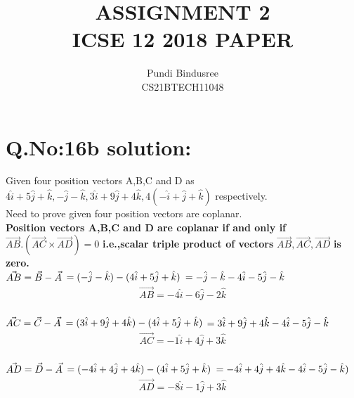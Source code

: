 \documentclass[journal, 11pt,twocolumn]{IEEEtran}
\begin{document}
\title{\huge ASSIGNMENT 2\\ \huge ICSE 12 2018 PAPER}
\author{\Small Pundi Bindusree\\ \small CS21BTECH11048 }
\maketitle
\vspace{-12pt}
\section*{\small Q.No:16b solution:}
Given four position vectors A,B,C and D as $4\hat{i}+5\hat{j}+\hat{k},-\hat{j}-\hat{k},3\hat{i}+9\hat{j}+4\hat{k},4(-\hat{i}+\hat{j}+\hat{k})$ respectively.\\
Need to prove given four position vectors are coplanar.\\
\textbf{Position vectors A,B,C and D are coplanar if and only if} $\vec{AB}.(\vec{AC}\times\vec{AD})=0$ \textbf{i.e.,scalar triple product of vectors} $\vec{AB},\vec{AC},\vec{AD}$ \textbf{is zero.}\\

$\vec{AB} = \vec{B}-\vec{A}\nonumber\\$
$         = (-\hat{j}-\hat{k})-(4\hat{i}+5\hat{j}+\hat{k})\nonumber\\$
$         = -\hat{j}-\hat{k}-4\hat{i}-5\hat{j}-\hat{k}\nonumber\\$
\begin{align}\vec{AB} = -4\hat{i}-6\hat{j}-2\hat{k}\end{align}\\
$\vec{AC} = \vec{C}-\vec{A}\nonumber\\$
$         = (3\hat{i}+9\hat{j}+4\hat{k})-(4\hat{i}+5\hat{j}+\hat{k})\nonumber\\$      
$         = 3\hat{i}+9\hat{j}+4\hat{k}-4\hat{i}-5\hat{j}-\hat{k}\nonumber\\$   
\begin{align}\vec{AC} = -1\hat{i}+4\hat{j}+3\hat{k}\end{align}\\
$\vec{AD} = \vec{D}-\vec{A}\nonumber\\$
$         = (-4\hat{i}+4\hat{j}+4\hat{k})-(4\hat{i}+5\hat{j}+\hat{k})\nonumber\\$
$         = -4\hat{i}+4\hat{j}+4\hat{k}-4\hat{i}-5\hat{j}-\hat{k})\nonumber\\$
\begin{align}\vec{AD} = -8\hat{i}-1\hat{j}+3\hat{k}\end{align}\\
\end{document}
